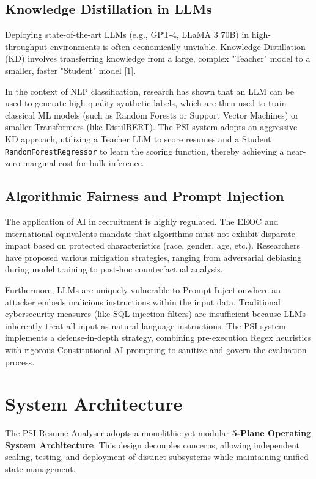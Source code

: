 \documentclass[10pt,journal,compsoc]{IEEEtran}
\begin{document}
\subsection{Knowledge Distillation in LLMs}
Deploying state-of-the-art LLMs (e.g., GPT-4, LLaMA 3 70B) in high-throughput environments is often economically unviable. Knowledge Distillation (KD) involves transferring knowledge from a large, complex "Teacher" model to a smaller, faster "Student" model [1]. 

In the context of NLP classification, research has shown that an LLM can be used to generate high-quality synthetic labels, which are then used to train classical ML models (such as Random Forests or Support Vector Machines) or smaller Transformers (like DistilBERT). The PSI system adopts an aggressive KD approach, utilizing a Teacher LLM to score resumes and a Student \texttt{RandomForestRegressor} to learn the scoring function, thereby achieving a near-zero marginal cost for bulk inference.

\subsection{Algorithmic Fairness and Prompt Injection}
The application of AI in recruitment is highly regulated. The EEOC and international equivalents mandate that algorithms must not exhibit disparate impact based on protected characteristics (race, gender, age, etc.). Researchers have proposed various mitigation strategies, ranging from adversarial debiasing during model training to post-hoc counterfactual analysis.

Furthermore, LLMs are uniquely vulnerable to Prompt Injectionwhere an attacker embeds malicious instructions within the input data. Traditional cybersecurity measures (like SQL injection filters) are insufficient because LLMs inherently treat all input as natural language instructions. The PSI system implements a defense-in-depth strategy, combining pre-execution Regex heuristics with rigorous Constitutional AI prompting to sanitize and govern the evaluation process.


\section{System Architecture}\label{sec:architecture}

The PSI Resume Analyser adopts a monolithic-yet-modular \textbf{5-Plane Operating System Architecture}. This design decouples concerns, allowing independent scaling, testing, and deployment of distinct subsystems while maintaining unified state management.
\end{document}
